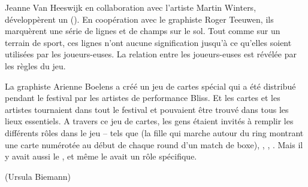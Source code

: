 {{Jeanne Van Heeswijk en collaboration avec
l'artiste Martin Winters, d\'evelopp\`erent un
 (). En coop\'eration avec le graphiste Roger
Teeuwen, ils marqu\`erent une s\'erie de lignes et de champs sur le
sol. Tout comme sur un terrain de sport, ces lignes
n'ont aucune signification jusqu'\`a
ce qu'elles soient utilis\'ees par les
joueurs{}-euses. La relation entre les joueurs{}-euses est
r\'ev\'el\'ee par les r\`egles du jeu.

La graphiste Arienne Boelens a cr\'e\'e un jeu de cartes sp\'ecial qui a
\'et\'e distribu\'e pendant le festival par les artistes de performance
Bliss. Et les cartes et les artistes tournaient dans tout le festival
et pouvaient \^etre trouv\'e dans tous les lieux essentiels. A travers ce jeu
de cartes, les gens \'etaient invit\'es \`a remplir les diff\'erents
r\^oles dans le jeu {--} tels que  (la fille qui marche
autour du ring montrant une carte num\'erot\'ee au d\'ebut de chaque
round d'un match de boxe), ,
,
. Mais il y avait aussi le , et m\^eme le
 avait un r\^ole sp\'ecifique.

\blank
{} (Ursula
Biemann)
\blank
{}
}
}

